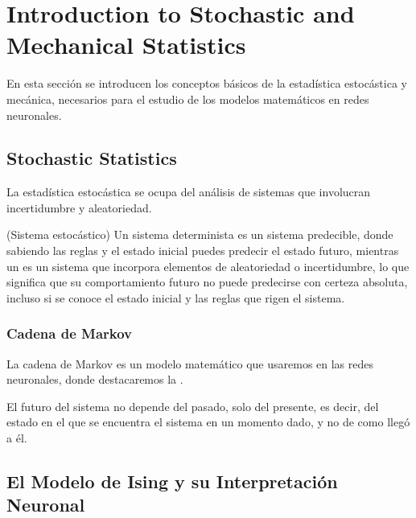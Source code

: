 \chapter{Introduction to Stochastic and Mechanical Statistics}

En esta sección se introducen los conceptos básicos de la estadística estocástica y mecánica, necesarios para el estudio de los modelos matemáticos en redes neuronales.

\section{Stochastic Statistics}
\noindent
La estadística estocástica se ocupa del análisis de sistemas que involucran incertidumbre y aleatoriedad. 

\begin{definicion}(Sistema estocástico)
    Un sistema determinista es un sistema predecible, donde sabiendo las reglas y el estado inicial puedes predecir el estado futuro, mientras un  es un sistema que incorpora elementos de aleatoriedad o incertidumbre, lo que significa que su comportamiento futuro no puede predecirse con certeza absoluta, incluso si se conoce el estado inicial y las reglas que rigen el sistema.
\end{definicion}

\subsection{Cadena de Markov}

\noindent
La cadena de Markov es un modelo matemático que usaremos en las redes neuronales, donde destacaremos la .

\begin{teo}
    El futuro del sistema no depende del pasado, solo del presente, es decir, del estado en el que se encuentra el sistema en un momento dado, y no de como llegó a él.
\end{teo}


\section{El Modelo de Ising y su Interpretación Neuronal}

